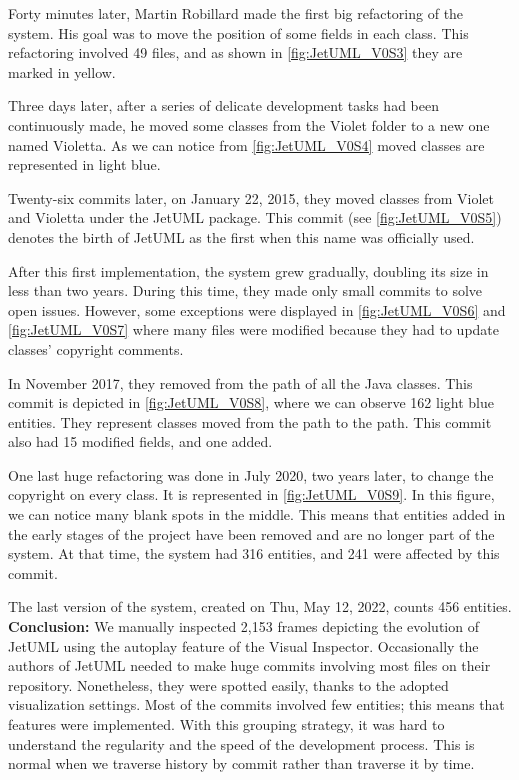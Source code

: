 Forty minutes later, Martin Robillard made the first big refactoring of the system. His goal was to move the position of some fields in each class. This refactoring involved 49 files, and as shown in \autoref{fig:JetUML_V0S3} they are marked in yellow. 

Three days later, after a series of delicate development tasks had been continuously made, he moved some classes from the Violet folder to a new one named Violetta. As we can notice from \autoref{fig:JetUML_V0S4} moved classes are represented in light blue. 

Twenty-six commits later, on January 22, 2015, they moved classes from Violet and Violetta under the JetUML package. 
This commit (see \autoref{fig:JetUML_V0S5}) denotes the birth of JetUML as the first when this name was officially used.

After this first implementation, the system grew gradually, doubling its size in less than two years. 
During this time, they made only small commits to solve open issues. However, some exceptions were displayed in \autoref{fig:JetUML_V0S6} and \autoref{fig:JetUML_V0S7} where many files were modified because they had to update classes' copyright comments. 

In November 2017, they removed  from the path of all the Java classes. This commit is depicted in \autoref{fig:JetUML_V0S8}, where we can observe 162 light blue entities. They represent classes moved from the  path to the 
 path. This commit also had 15 modified fields, and one added. 

One last huge refactoring was done in July 2020, two years later, to change the copyright on every class. It is represented in \autoref{fig:JetUML_V0S9}. In this figure, we can notice many blank spots in the middle. This means that entities added in the early stages of the project have been removed and are no longer part of the system. At that time, the system had 316 entities, and 241 were affected by this commit. 

The last version of the system, created on Thu, May 12, 2022, counts 456 entities. 
\bigbreak
\textbf{Conclusion:}
We manually inspected 2,153 frames depicting the evolution of JetUML using the autoplay feature of the Visual Inspector.
Occasionally the authors of JetUML needed to make huge commits involving most files on their repository. Nonetheless, they were spotted easily, thanks to the adopted visualization settings. 
Most of the commits involved few entities; this means that features were implemented. 
With this grouping strategy, it was hard to understand the regularity and the speed of the development process. This is normal when we traverse history by commit rather than traverse it by time. 

